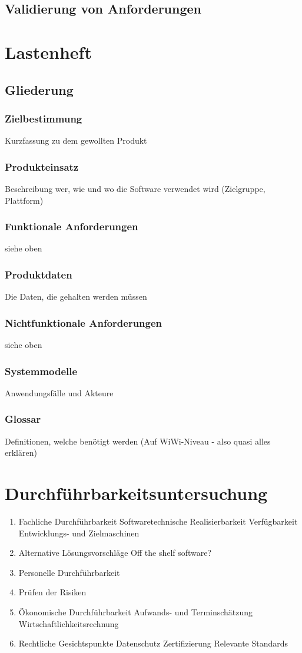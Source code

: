 \documentclass[a4paper]{article}
\theoremstyle{break}
\begin{document}
\subsection{Validierung von Anforderungen}

\newpage
\section{Lastenheft}
\subsection{Gliederung}
\localtableofcontents
\subsubsection{Zielbestimmung}
Kurzfassung zu dem gewollten Produkt
\subsubsection{Produkteinsatz}
Beschreibung wer, wie und wo die Software verwendet wird (Zielgruppe, Plattform)
\subsubsection{Funktionale Anforderungen}
siehe oben
\subsubsection{Produktdaten}
Die Daten, die gehalten werden müssen
\subsubsection{Nichtfunktionale Anforderungen}
siehe oben
\subsubsection{Systemmodelle}
Anwendungsfälle und Akteure
\subsubsection{Glossar}
Definitionen, welche benötigt werden (Auf WiWi-Niveau - also quasi alles erklären)
\newpage
\section{Durchführbarkeitsuntersuchung}
\begin{enumerate}
	\item Fachliche Durchführbarkeit
		\subitem Softwaretechnische Realisierbarkeit
		\subitem Verfügbarkeit Entwicklungs- und Zielmaschinen
	\item Alternative Lösungsvorschläge
		\subitem Off the shelf software?
	\item Personelle Durchführbarkeit
	\item Prüfen der Risiken
	\item Ökonomische Durchführbarkeit
		\subitem Aufwands- und Terminschätzung
		\subitem Wirtschaftlichkeitsrechnung
	\item Rechtliche Gesichtspunkte
		\subitem Datenschutz
		\subitem Zertifizierung
		\subitem Relevante Standards
\end{enumerate}
\end{document}
